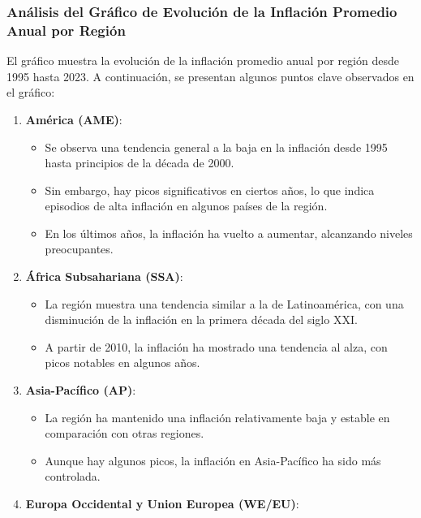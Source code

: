 \documentclass[
]{article}
\providecommand{\tightlist}{%
  \setlength{\itemsep}{0pt}\setlength{\parskip}{0pt}}
\begin{document}
\subsubsection{Análisis del Gráfico de Evolución de la Inflación
Promedio Anual por
Región}\label{anuxe1lisis-del-gruxe1fico-de-evoluciuxf3n-de-la-inflaciuxf3n-promedio-anual-por-regiuxf3n}

El gráfico muestra la evolución de la inflación promedio anual por
región desde 1995 hasta 2023. A continuación, se presentan algunos
puntos clave observados en el gráfico:

\begin{enumerate}
\def\labelenumi{\arabic{enumi}.}
\tightlist
\item
  \textbf{América (AME)}:

  \begin{itemize}
  \tightlist
  \item
    Se observa una tendencia general a la baja en la inflación desde
    1995 hasta principios de la década de 2000.
  \item
    Sin embargo, hay picos significativos en ciertos años, lo que indica
    episodios de alta inflación en algunos países de la región.
  \item
    En los últimos años, la inflación ha vuelto a aumentar, alcanzando
    niveles preocupantes.
  \end{itemize}
\item
  \textbf{África Subsahariana (SSA)}:

  \begin{itemize}
  \tightlist
  \item
    La región muestra una tendencia similar a la de Latinoamérica, con
    una disminución de la inflación en la primera década del siglo XXI.
  \item
    A partir de 2010, la inflación ha mostrado una tendencia al alza,
    con picos notables en algunos años.
  \end{itemize}
\item
  \textbf{Asia-Pacífico (AP)}:

  \begin{itemize}
  \tightlist
  \item
    La región ha mantenido una inflación relativamente baja y estable en
    comparación con otras regiones.
  \item
    Aunque hay algunos picos, la inflación en Asia-Pacífico ha sido más
    controlada.
  \end{itemize}
\item
  \textbf{Europa Occidental y Union Europea (WE/EU)}:


\end{enumerate}
\end{document}
